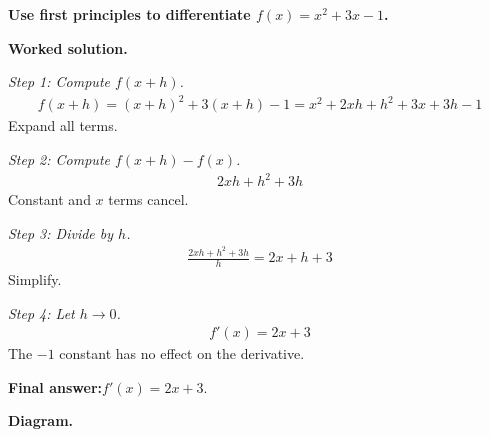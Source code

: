 \documentclass[11pt]{article}
\newcommand{\question}[1]{\par\medskip\noindent\textbf{#1}\par}
\begin{document}
\question{Use first principles to differentiate \( f(x) = x^2 + 3x - 1 \).}

\textbf{Worked solution.}

\textit{Step 1: Compute \( f(x+h) \).}
\[\begin{gathered}
f(x+h) = (x+h)^2 + 3(x+h) - 1 = x^2 + 2xh + h^2 + 3x + 3h - 1
\end{gathered}\]
Expand all terms.

\textit{Step 2: Compute \( f(x+h) - f(x) \).}
\[\begin{gathered}
2xh + h^2 + 3h
\end{gathered}\]
Constant and \( x \) terms cancel.

\textit{Step 3: Divide by \( h \).}
\[\begin{gathered}
\frac{2xh + h^2 + 3h}{h} = 2x + h + 3
\end{gathered}\]
Simplify.

\textit{Step 4: Let \( h \to 0 \).}
\[\begin{gathered}
f'(x) = 2x + 3
\end{gathered}\]
The \( -1 \) constant has no effect on the derivative.

\begin{answerbox}
\textbf{Final answer:}\quad \(\displaystyle  f'(x) = 2x + 3 \).
\end{answerbox}
\textbf{Diagram.}
\end{document}
